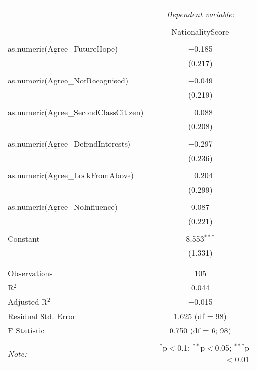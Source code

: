 \documentclass{article}
\begin{document}
\begin{table}[!htbp] \centering 
  \caption{} 
  \label{} 
\begin{tabular}{@{\extracolsep{5pt}}lc} 
\\[-1.8ex]\hline 
\hline \\[-1.8ex] 
 & \multicolumn{1}{c}{\textit{Dependent variable:}} \\ 
\cline{2-2} 
\\[-1.8ex] & NationalityScore \\ 
\hline \\[-1.8ex] 
 as.numeric(Agree\_FutureHope) & $-$0.185 \\ 
  & (0.217) \\ 
  & \\ 
 as.numeric(Agree\_NotRecognised) & $-$0.049 \\ 
  & (0.219) \\ 
  & \\ 
 as.numeric(Agree\_SecondClassCitizen) & $-$0.088 \\ 
  & (0.208) \\ 
  & \\ 
 as.numeric(Agree\_DefendInterests) & $-$0.297 \\ 
  & (0.236) \\ 
  & \\ 
 as.numeric(Agree\_LookFromAbove) & $-$0.204 \\ 
  & (0.299) \\ 
  & \\ 
 as.numeric(Agree\_NoInfluence) & 0.087 \\ 
  & (0.221) \\ 
  & \\ 
 Constant & 8.553$^{***}$ \\ 
  & (1.331) \\ 
  & \\ 
\hline \\[-1.8ex] 
Observations & 105 \\ 
R$^{2}$ & 0.044 \\ 
Adjusted R$^{2}$ & $-$0.015 \\ 
Residual Std. Error & 1.625 (df = 98) \\ 
F Statistic & 0.750 (df = 6; 98) \\ 
\hline 
\hline \\[-1.8ex] 
\textit{Note:}  & \multicolumn{1}{r}{$^{*}$p$<$0.1; $^{**}$p$<$0.05; $^{***}$p$<$0.01} \\ 
\end{tabular} 
\end{table} 
\end{document}
